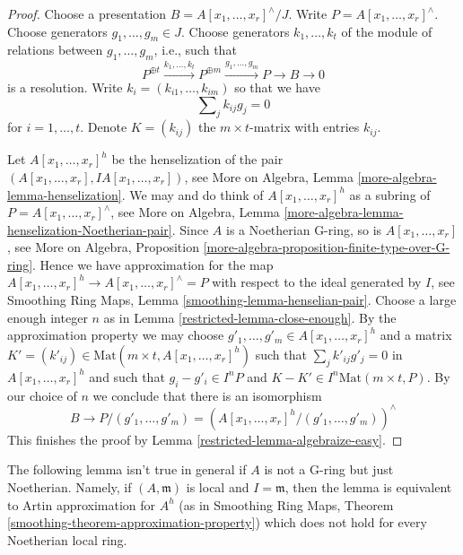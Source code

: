 \begin{proof}

Choose a presentation $B = A[x_1, \ldots, x_r]^\wedge/J$. Write
$P = A[x_1, \ldots, x_r]^\wedge$. Choose generators $g_1, \ldots, g_m \in J$.
Choose generators $k_1, \ldots, k_t$ of the module
of relations between $g_1, \ldots, g_m$, i.e., such that
$$
P^{\oplus t} \xrightarrow{k_1, \ldots, k_t}
P^{\oplus m} \xrightarrow{g_1, \ldots, g_m}
P \to B \to 0
$$
is a resolution. Write $k_i = (k_{i1}, \ldots, k_{im})$ so that we have
\begin{equation}
\label{equation-relations-straight-up}
\sum\nolimits_j k_{ij}g_j = 0
\end{equation}
for $i = 1, \ldots, t$. Denote $K = (k_{ij})$ the $m \times t$-matrix
with entries $k_{ij}$.

\medskip\noindent
Let $A[x_1, \ldots, x_r]^h$ be the henselization of the
pair $(A[x_1, \ldots, x_r], IA[x_1, \ldots, x_r])$, see
More on Algebra, Lemma \ref{more-algebra-lemma-henselization}.
We may and do think of $A[x_1, \ldots, x_r]^h$ as a subring
of $P = A[x_1, \ldots, x_r]^\wedge$, see
More on Algebra, Lemma
\ref{more-algebra-lemma-henselization-Noetherian-pair}.
Since $A$ is a Noetherian G-ring, so is $A[x_1, \ldots, x_r]$, see
More on Algebra, Proposition
\ref{more-algebra-proposition-finite-type-over-G-ring}.
Hence we have approximation for the map
$A[x_1, \ldots, x_r]^h \to A[x_1, \ldots, x_r]^\wedge = P$
with respect to the ideal generated by $I$, see
Smoothing Ring Maps, Lemma \ref{smoothing-lemma-henselian-pair}.
Choose a large enough integer $n$ as in Lemma \ref{restricted-lemma-close-enough}.
By the approximation property we may choose
$g'_1, \ldots, g'_m \in A[x_1, \ldots, x_r]^h$
and a matrix
$K' = (k'_{ij}) \in \text{Mat}(m \times t, A[x_1, \ldots, x_r]^h)$
such that $\sum\nolimits_j k'_{ij}g'_j = 0$ in
$A[x_1, \ldots, x_r]^h$ and such that
$g_i - g'_i \in I^nP$ and $K - K' \in I^n\text{Mat}(m \times t, P)$.
By our choice of $n$ we conclude that there is an isomorphism
$$
B \to P/(g'_1, \ldots, g'_m) =
\left(A[x_1, \ldots, x_r]^h/(g'_1, \ldots, g'_m)\right)^\wedge
$$
This finishes the proof by Lemma \ref{restricted-lemma-algebraize-easy}.
\end{proof}

The following lemma isn't true in general if $A$ is not a G-ring
but just Noetherian. Namely, if $(A, \mathfrak m)$ is local
and $I = \mathfrak m$, then the lemma is equivalent to
Artin approximation for $A^h$ (as in
Smoothing Ring Maps, Theorem \ref{smoothing-theorem-approximation-property})
which does not hold for every Noetherian local ring.

